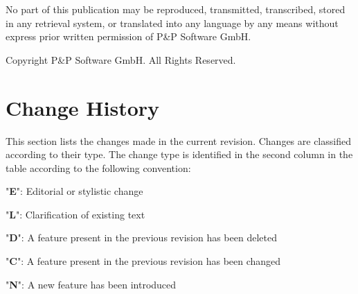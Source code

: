\documentclass[a4paper,10pt]{article}
\let\stdsection\section
\renewcommand\section{\newpage\stdsection}
\newenvironment{fw_itemize}						%
{\begin{itemize}
  \setlength{\itemsep}{1mm}
  \setlength{\parskip}{0pt}
  \setlength{\parsep}{0pt}}
{\end{itemize}}
\begin{document}
\newpage
\vspace*{\fill}
\begin{center}
No part of this publication may be reproduced, transmitted, transcribed, stored in any retrieval system, or translated into any language by any means without express prior written permission of P\&P Software GmbH.
\end{center}

\begin{center}
Copyright  P\&P Software GmbH. All Rights Reserved. 
\end{center}
\vspace*{\fill}

\newpage
\tableofcontents

\newpage
\listoffigures
\listoftables

\newpage

\setlength{\parskip}{3mm}						%

\section{Change History}

This section lists the changes made in the current revision. Changes are classified according to their type. The change type is identified in the second column in the table according to the following convention:

\begin{fw_itemize}
\item "\textbf{E}": Editorial or stylistic change
\item "\textbf{L}": Clarification of existing text
\item "\textbf{D}": A feature present in the previous revision has been deleted
\item "\textbf{C}": A feature present in the previous revision has been changed
\item "\textbf{N}": A new feature has been introduced
\end{fw_itemize}
\end{document}
